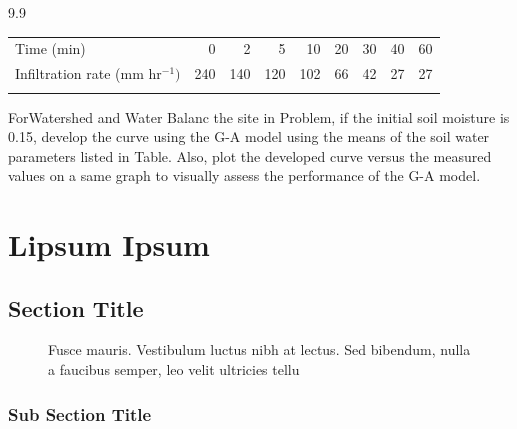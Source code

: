 \begin{problemlist}{9.9}
\begin{enumerate}[(2)]
\begin{unnumtable} [!h]
\processtable{}
{\hspace*{-28pt}\begin{tabular}{@{}lrrrrrrrr}
\dtoprule Time (min)& 0& 2& 5& 10& 20& 30& 40&60 \\[3pt]
Infiltration rate (mm hr$^{-1})$& 240& 140& 120& 102&
66&42& 27&27 \\
\dbottomrule
\end{tabular}}{}
\end{unnumtable}
\end{enumerate}


\item\label{ch01:prob3.16} ForWatershed and Water Balanc the
    site in Problem, if the
    initial soil moisture is 0.15, develop
    the curve using the G-A model
    using the means of the soil water parameters listed in
    Table. Also, plot the developed curve versus the measured
    values on a same graph to visually assess the performance
    of the G-A model.

\end{problemlist}




\chapter{Lipsum Ipsum}
\label{ch01:chap01}



\lipsum[5]

\section{Section Title}
\label{ch01:sec3.1}

\lipsum[5]

\begin{figure}
{}
\caption{Fusce mauris. Vestibulum luctus nibh at lectus. Sed bibendum, nulla a faucibus semper, leo velit
ultricies tellu}
\end{figure}

\subsection{Sub Section Title}
\label{ch01:sec3.1.1}

\lipsum[5]


